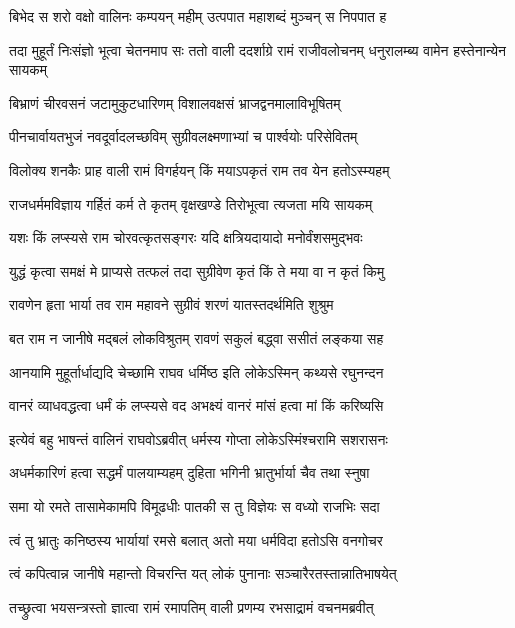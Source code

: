 \twolineshloka
{बिभेद स शरो वक्षो वालिनः कम्पयन् महीम्}
{उत्पपात महाशब्दं मुञ्चन् स निपपात ह} %

\threelineshloka
{तदा मुहूर्तं निःसंज्ञो भूत्वा चेतनमाप सः}
{ततो वाली ददर्शाग्रे रामं राजीवलोचनम्}
{धनुरालम्ब्य वामेन हस्तेनान्येन सायकम्} %

\twolineshloka
{बिभ्राणं चीरवसनं जटामुकुटधारिणम्}
{विशालवक्षसं भ्राजद्वनमालाविभूषितम्} %

\twolineshloka
{पीनचार्वायतभुजं नवदूर्वादलच्छविम्}
{सुग्रीवलक्ष्मणाभ्यां च पार्श्वयोः परिसेवितम्} %

\twolineshloka
{विलोक्य शनकैः प्राह वाली रामं विगर्हयन्}
{किं मयाऽपकृतं राम तव येन हतोऽस्म्यहम्} %

\twolineshloka
{राजधर्ममविज्ञाय गर्हितं कर्म ते कृतम्}
{वृक्षखण्डे तिरोभूत्वा त्यजता मयि सायकम्} %

\twolineshloka
{यशः किं लप्स्यसे राम चोरवत्कृतसङ्गरः}
{यदि क्षत्रियदायादो मनोर्वंशसमुद्भवः} %

\twolineshloka
{युद्धं कृत्वा समक्षं मे प्राप्यसे तत्फलं तदा}
{सुग्रीवेण कृतं किं ते मया वा न कृतं किमु} %

\twolineshloka
{रावणेन हृता भार्या तव राम महावने}
{सुग्रीवं शरणं यातस्तदर्थमिति शुश्रुम} %

\twolineshloka
{बत राम न जानीषे मद्बलं लोकविश्रुतम्}
{रावणं सकुलं बद्\mbox{}ध्वा ससीतं लङ्कया सह} %

\twolineshloka
{आनयामि मुहूर्तार्धाद्यदि चेच्छामि राघव}
{धर्मिष्ठ इति लोकेऽस्मिन् कथ्यसे रघुनन्दन} %

\twolineshloka
{वानरं व्याधवद्धत्वा धर्मं कं लप्स्यसे वद}
{अभक्ष्यं वानरं मांसं हत्वा मां किं करिष्यसि} %

\twolineshloka
{इत्येवं बहु भाषन्तं वालिनं राघवोऽब्रवीत्}
{धर्मस्य गोप्ता लोकेऽस्मिंश्चरामि सशरासनः} %

\twolineshloka
{अधर्मकारिणं हत्वा सद्धर्मं पालयाम्यहम्}
{दुहिता भगिनी भ्रातुर्भार्या चैव तथा स्नुषा} %

\twolineshloka
{समा यो रमते तासामेकामपि विमूढधीः}
{पातकी स तु विज्ञेयः स वध्यो राजभिः सदा} %

\twolineshloka
{त्वं तु भ्रातुः कनिष्ठस्य भार्यायां रमसे बलात्}
{अतो मया धर्मविदा हतोऽसि वनगोचर} %

\twolineshloka
{त्वं कपित्वान्न जानीषे महान्तो विचरन्ति यत्}
{लोकं पुनानाः सञ्चारैरतस्तान्नातिभाषयेत्} %

\twolineshloka
{तच्छ्रुत्वा भयसन्त्रस्तो ज्ञात्वा रामं रमापतिम्}
{वाली प्रणम्य रभसाद्रामं वचनमब्रवीत्} %

